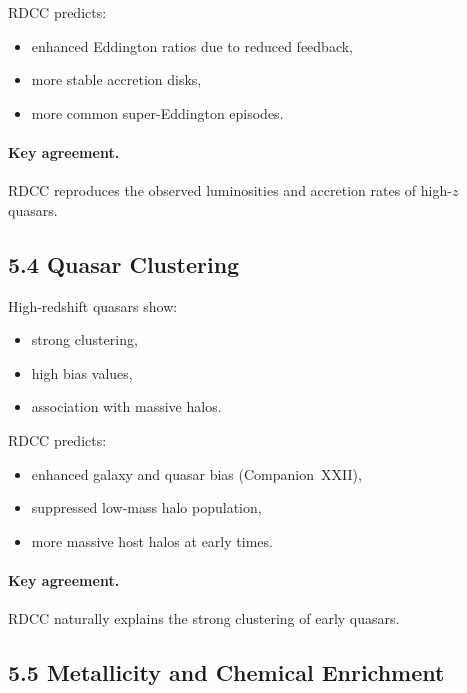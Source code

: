 \documentclass[11pt,a4paper]{article}
\begin{document}
RDCC predicts:

\begin{itemize}
    \item enhanced Eddington ratios due to reduced feedback,
    \item more stable accretion disks,
    \item more common super-Eddington episodes.
\end{itemize}

\paragraph{Key agreement.}
RDCC reproduces the observed luminosities and accretion rates of high-$z$ quasars.

\subsection*{5.4 Quasar Clustering}

High-redshift quasars show:

\begin{itemize}
    \item strong clustering,
    \item high bias values,
    \item association with massive halos.
\end{itemize}

RDCC predicts:

\begin{itemize}
    \item enhanced galaxy and quasar bias (Companion~XXII),
    \item suppressed low-mass halo population,
    \item more massive host halos at early times.
\end{itemize}

\paragraph{Key agreement.}
RDCC naturally explains the strong clustering of early quasars.

\subsection*{5.5 Metallicity and Chemical Enrichment}
\end{document}
